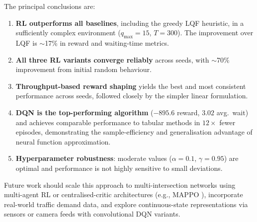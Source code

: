 \documentclass[12pt]{article}
\begin{document}
The principal conclusions are:
\begin{enumerate}[noitemsep]
    \item \textbf{RL outperforms all baselines}, including the greedy LQF heuristic, in
          a sufficiently complex environment ($q_\text{max}=15$, $T=300$). The
          improvement over LQF is $\sim$17\% in reward and waiting-time metrics.
    \item \textbf{All three RL variants converge reliably} across seeds, with $\sim$70\%
          improvement from initial random behaviour.
    \item \textbf{Throughput-based reward shaping} yields the best and most consistent
          performance across seeds, followed closely by the simpler linear formulation.
    \item \textbf{DQN is the top-performing algorithm} ($-895.6$ reward, $3.02$ avg.\ wait)
          and achieves comparable performance to tabular methods in $12\times$ fewer
          episodes, demonstrating the sample-efficiency and generalisation advantage of
          neural function approximation.
    \item \textbf{Hyperparameter robustness}: moderate values ($\alpha=0.1$,
          $\gamma=0.95$) are optimal and performance is not highly sensitive to small
          deviations.
\end{enumerate}

Future work should scale this approach to multi-intersection networks using multi-agent
RL or centralised-critic architectures (e.g., MAPPO \cite{yu2022}), incorporate
real-world traffic demand data, and explore continuous-state representations via
sensors or camera feeds with convolutional DQN variants.

\end{document}

